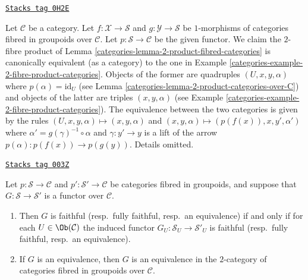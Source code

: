 \begin{remark}
\label{categories-remark-2-product-fibred-categories-same}
\href{https://stacks.math.columbia.edu/tag/0H2E}{\texttt{Stacks tag 0H2E}}

Let $\mathcal{C}$ be a category. Let $f : \mathcal{X} \to \mathcal{S}$
and $g : \mathcal{Y} \to \mathcal{S}$ be $1$-morphisms of
categories fibred in groupoids over $\mathcal{C}$.
Let $p : \mathcal{S} \to \mathcal{C}$ be the given functor.
We claim the $2$-fibre product of Lemma \ref{categories-lemma-2-product-fibred-categories}
is canonically equivalent (as a category) to the one in
Example \ref{categories-example-2-fibre-product-categories}.
Objects of the former are quadruples $(U, x, y, \alpha)$
where $p(\alpha) = \text{id}_U$
(see Lemma \ref{categories-lemma-2-product-categories-over-C})
and objects of the latter are triples $(x, y, \alpha)$ (see
Example \ref{categories-example-2-fibre-product-categories}).
The equivalence between the two categories is given by
the rules $(U, x, y, \alpha) \mapsto (x, y, \alpha)$
and $(x, y, \alpha) \mapsto (p(f(x)), x, y', \alpha')$
where $\alpha' = g(\gamma)^{-1} \circ \alpha$ and $\gamma : y' \to y$
is a lift of the arrow $p(\alpha) : p(f(x)) \to p(g(y))$.
Details omitted.
\end{remark}

\begin{lemma}
\label{categories-lemma-equivalence-fibred-categories}
\href{https://stacks.math.columbia.edu/tag/003Z}{\texttt{Stacks tag 003Z}}

Let $p : \mathcal{S}\to \mathcal{C}$ and
$p' : \mathcal{S'}\to \mathcal{C}$ be categories fibred in groupoids, and
suppose that $G : \mathcal{S}\to \mathcal {S}'$ is a functor over
$\mathcal{C}$.
\begin{enumerate}
\item Then $G$ is faithful (resp.\ fully faithful, resp.\ an equivalence)
if and only if for each $U\in\Ob(\mathcal{C})$ the induced functor
$G_U : \mathcal{S}_U\to \mathcal{S}'_U$ is faithful
(resp.\ fully faithful, resp.\ an equivalence).
\item If $G$ is an equivalence, then $G$ is an equivalence in the
$2$-category of categories fibred in groupoids over $\mathcal{C}$.
\end{enumerate}
\end{lemma}

